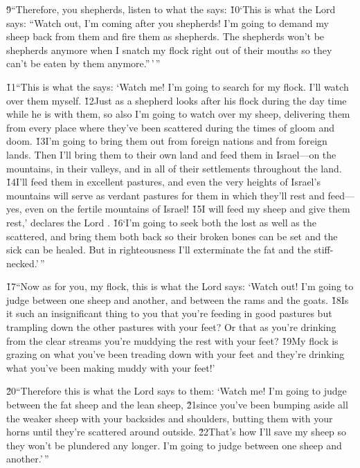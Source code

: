 \v{9}``Therefore, you shepherds, listen to what the  says: \v{10}`This is what the Lord  says: ``Watch out, I'm coming after you shepherds! I'm going to demand my sheep back from them and fire them as shepherds. The shepherds won't be shepherds anymore when I snatch my flock right out of their mouths so they can't be eaten by them anymore.''\,'\,''

\v{11}``This is what the  says: `Watch me! I'm going to search for my flock. I'll watch over them myself. \v{12}Just as a shepherd looks after his flock during the day time while he is with them, so also I'm going to watch over my sheep, delivering them from every place where they've been scattered during the times of gloom and doom. \v{13}I'm going to bring them out from foreign nations and from foreign lands. Then I'll bring them to their own land and feed them in Israel---on the mountains, in their valleys, and in all of their settlements throughout the land. \v{14}I'll feed them in excellent pastures, and even the very heights of Israel's mountains will serve as verdant pastures for them in which they'll rest and feed---yes, even on the fertile mountains of Israel! \v{15}I will feed my sheep and give them rest,' declares the Lord . \v{16}`I'm going to seek both the lost as well as the scattered, and bring them both back so their broken bones can be set and the sick can be healed. But in righteousness I'll exterminate the fat and the stiff-necked.'\,''

\v{17}``Now as for you, my flock, this is what the Lord  says: `Watch out! I'm going to judge between one sheep and another, and between the rams and the goats. \v{18}Is it such an insignificant thing to you that you're feeding in good pastures but trampling down the other pastures with your feet? Or that as you're drinking from the clear streams you're muddying the rest with your feet? \v{19}My flock is grazing on what you've been treading down with your feet and they're drinking what you've been making muddy with your feet!'

\v{20}``Therefore this is what the Lord  says to them: `Watch me! I'm going to judge between the fat sheep and the lean sheep, \v{21}since you've been bumping aside all the weaker sheep with your backsides and shoulders, butting them with your horns until they're scattered around outside. \v{22}That's how I'll save my sheep so they won't be plundered any longer. I'm going to judge between one sheep and another.'\,''

